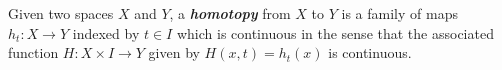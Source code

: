 \documentclass[preview]{standalone}
\begin{document}
\begin{center}
Given two spaces $X$ and $Y$, a \textbf{\textit{homotopy}} from $X$ to $Y$ is a family of maps $h_t : X \to Y$ indexed by $t \in I$ which is continuous in the sense that the associated function $H : X \times I \to Y$ given by $H(x,t) = h_t(x)$ is continuous.
\end{center}
\end{document}
